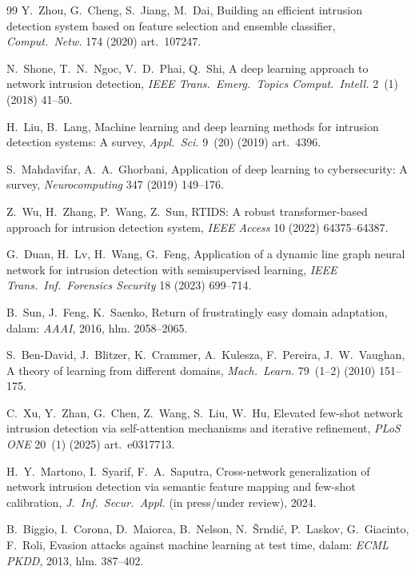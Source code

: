 \documentclass[11pt,a4paper]{article}
\begin{document}
\begin{thebibliography}{99}
 Y.~Zhou, G.~Cheng, S.~Jiang, M.~Dai, Building an efficient intrusion
detection system based on feature selection and ensemble classifier, \emph{Comput.\
Netw.} 174 (2020) art.~107247.

 N.~Shone, T.~N.~Ngoc, V.~D.~Phai, Q.~Shi, A deep learning approach to
network intrusion detection, \emph{IEEE Trans.\ Emerg.\ Topics Comput.\ Intell.}
2~(1) (2018) 41--50.

 H.~Liu, B.~Lang, Machine learning and deep learning methods for
intrusion detection systems: A survey, \emph{Appl.\ Sci.} 9~(20) (2019) art.~4396.

 S.~Mahdavifar, A.~A.~Ghorbani, Application of deep learning to
cybersecurity: A survey, \emph{Neurocomputing} 347 (2019) 149--176.

 Z.~Wu, H.~Zhang, P.~Wang, Z.~Sun, RTIDS: A robust transformer-based
approach for intrusion detection system, \emph{IEEE Access} 10 (2022) 64375--64387.

 G.~Duan, H.~Lv, H.~Wang, G.~Feng, Application of a dynamic line graph
neural network for intrusion detection with semisupervised learning, \emph{IEEE
Trans.\ Inf.\ Forensics Security} 18 (2023) 699--714.

 B.~Sun, J.~Feng, K.~Saenko, Return of frustratingly easy domain
adaptation, dalam: \emph{AAAI}, 2016, hlm. 2058--2065.

 S.~Ben-David, J.~Blitzer, K.~Crammer, A.~Kulesza, F.~Pereira,
J.~W.~Vaughan, A theory of learning from different domains, \emph{Mach.\ Learn.}
79~(1--2) (2010) 151--175.

 C.~Xu, Y.~Zhan, G.~Chen, Z.~Wang, S.~Liu, W.~Hu, Elevated few-shot
network intrusion detection via self-attention mechanisms and iterative refinement,
\emph{PLoS ONE} 20~(1) (2025) art.~e0317713.

 H.~Y.~Martono, I.~Syarif, F.~A.~Saputra, Cross-network
generalization of network intrusion detection via semantic feature mapping and
few-shot calibration, \emph{J.\ Inf.\ Secur.\ Appl.} (in press/under review), 2024.

 B.~Biggio, I.~Corona, D.~Maiorca, B.~Nelson, N.~\v{S}rndi\'c,
P.~Laskov, G.~Giacinto, F.~Roli, Evasion attacks against machine learning at test
time, dalam: \emph{ECML PKDD}, 2013, hlm. 387--402.


\end{thebibliography}
\end{document}
